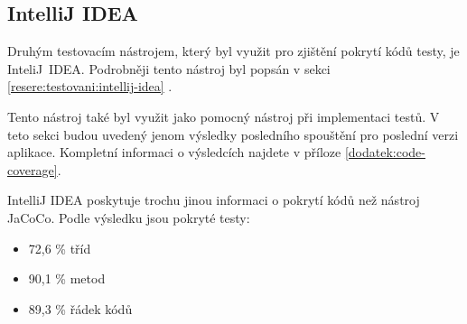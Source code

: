     \subsection{IntelliJ IDEA}
    Druhým testovacím nástrojem, který byl využit pro zjištění pokrytí kódů testy, je InteliJ~IDEA. Podrobněji tento nástroj byl popsán v sekci \ref{resere:testovani:intellij-idea} . 
    
    Tento nástroj také byl využit jako pomocný nástroj při implementaci testů. V teto sekci budou uvedený jenom výsledky posledního spouštění pro poslední verzi aplikace. Kompletní informaci o výsledcích najdete v příloze \ref{dodatek:code-coverage}.
    
    IntelliJ IDEA poskytuje trochu jinou informaci o pokrytí kódů než nástroj JaCoCo. Podle výsledku jsou pokryté testy:
    \begin{itemize}
            \item 72,6 \% tříd
            \item 90,1 \% metod
            \item 89,3 \% řádek kódů
    \end{itemize}